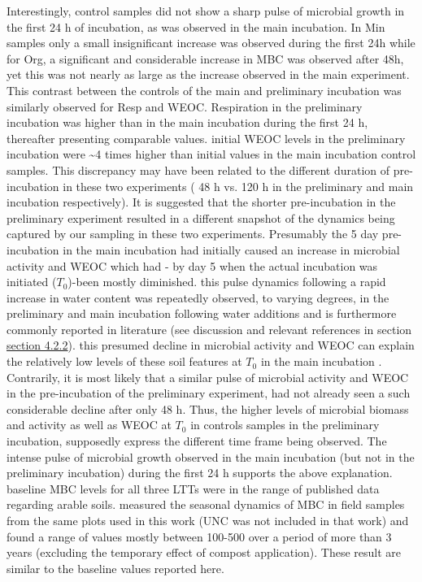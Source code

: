 	Interestingly, control samples did not show a sharp pulse of microbial growth in the first 24 h of incubation, as was observed in the main incubation. In Min samples only a small insignificant increase was observed during the first 24h while for Org, a significant and considerable increase in MBC was observed after 48h, yet this was  not nearly as large as the increase observed in the main experiment. This contrast between the controls of the main and preliminary incubation was similarly observed for Resp and WEOC. Respiration in the preliminary incubation was higher than in the main incubation during the first 24 h, thereafter presenting comparable values. initial WEOC levels in the preliminary incubation were \~{}4 times higher than initial values in the main incubation control samples. This discrepancy may have been related to the different duration of pre-incubation in these two experiments ( 48 h vs. 120 h in the preliminary and main incubation respectively). It is suggested that the shorter pre-incubation in the preliminary experiment resulted in a different snapshot of the dynamics being captured by our sampling in these two experiments. Presumably the 5 day pre-incubation in the main incubation had initially caused an increase in microbial activity and WEOC which had - by day 5 when the actual incubation was initiated ($ T_0 $)-been mostly diminished. this pulse dynamics following a rapid increase in water content was repeatedly observed, to varying degrees, in the preliminary and main incubation following water additions and is furthermore commonly reported in literature (see discussion and relevant references in section \hyperref[subsection_4.2.2]{section 4.2.2}). this presumed decline in microbial activity and WEOC can explain the relatively low levels of these soil features at $ T_0 $ in the main incubation . Contrarily, it is most likely that a similar pulse of microbial activity and WEOC in the pre-incubation of the preliminary experiment, had not already seen a such considerable decline after only 48 h. Thus, the higher levels of microbial biomass and activity as well as WEOC at $ T_0 $ in controls samples in the preliminary incubation, supposedly express the different time frame being observed. The intense pulse of microbial growth observed in the main incubation (but not in the preliminary incubation) during the first 24 h supports the above explanation.\\
	baseline MBC levels for all three LTTs were in the range of published data regarding arable soils\citep{gonzalez-quinones2011}. \citet{rotbart2018} measured the seasonal dynamics of MBC in field samples from the same plots used in this work (UNC was not included in that work) and found a range of values mostly between 100-500 \genericunit over a period of more than 3 years (excluding the temporary effect of compost application). These result are similar to the baseline values reported here.
